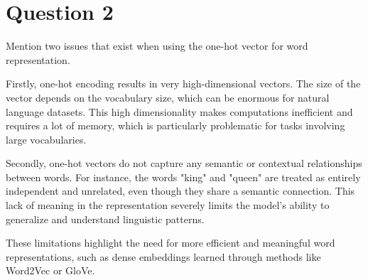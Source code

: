 \section{Question 2}

Mention two issues that exist when using the one-hot vector for word representation.
\begin{qsolve}
    \begin{qsolve}[]
        Firstly, one-hot encoding results in very high-dimensional vectors. The size of the vector depends on the vocabulary size, which can be enormous for natural language datasets. This high dimensionality makes computations inefficient and requires a lot of memory, which is particularly problematic for tasks involving large vocabularies.

        Secondly, one-hot vectors do not capture any semantic or contextual relationships between words. For instance, the words "king" and "queen" are treated as entirely independent and unrelated, even though they share a semantic connection. This lack of meaning in the representation severely limits the model's ability to generalize and understand linguistic patterns.
        
        These limitations highlight the need for more efficient and meaningful word representations, such as dense embeddings learned through methods like Word2Vec or GloVe.
    \end{qsolve}
\end{qsolve}